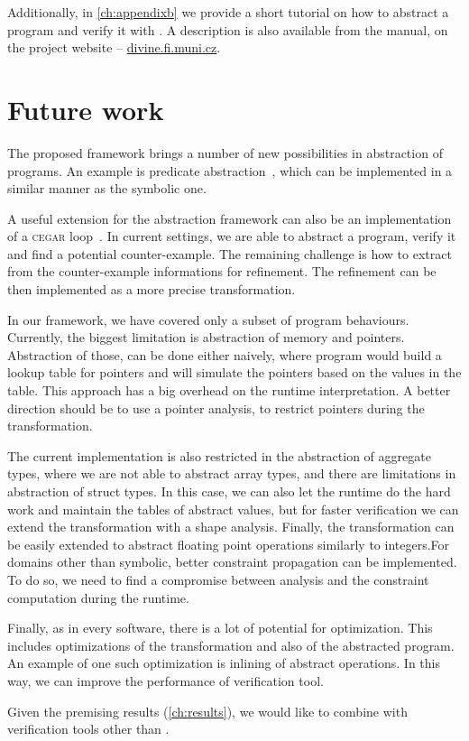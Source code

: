 Additionally, in \autoref{ch:appendixb} we provide a short tutorial on how to
abstract a program and verify it with \DIVINE. A description is also
available from the manual, on the project website -- \url{divine.fi.muni.cz}.

\section{Future work}

The proposed framework brings a number of new possibilities in abstraction of
programs. An example is predicate abstraction~\cite{Flanagan02}, which can be
implemented in a similar manner as the symbolic one.

A useful extension for the abstraction framework can also be an implementation
of a \textsc{cegar} loop~\cite{Clarke20}. In current settings, we are able to
abstract a program, verify it and find a potential counter-example. The
remaining challenge is how to extract from the counter-example informations
for refinement. The refinement can be then implemented as a more precise
transformation.

In our framework, we have covered only a subset of program behaviours.
Currently, the biggest limitation is abstraction of memory and pointers.
Abstraction of those, can be done either naively, where program would build
a lookup table for pointers and will simulate the pointers based
on the values in the table. This approach has a big overhead on the runtime
interpretation. A better direction should be to use a pointer analysis, to
restrict pointers during the transformation.

The current implementation is also restricted in the abstraction of aggregate
types, where we are not able to abstract array types, and there are limitations
in abstraction of struct types. In this case, we can also let the runtime do the
hard work and maintain the tables of abstract values, but for faster
verification we can extend the transformation with a shape analysis. Finally,
the transformation can be easily extended to abstract floating
point operations similarly to integers.For domains other than
symbolic, better constraint propagation can be implemented. To do
so, we need to find a compromise between analysis and the
constraint computation during the runtime.

Finally, as in every software, there is a lot of potential for optimization.
This includes optimizations of the transformation and also of the abstracted program.
An example of one such optimization is inlining of abstract operations. In this
way, we can improve the performance of verification tool.

Given the premising results (\autoref{ch:results}), we would like to combine
\LART with verification tools other than \DIVINE.
